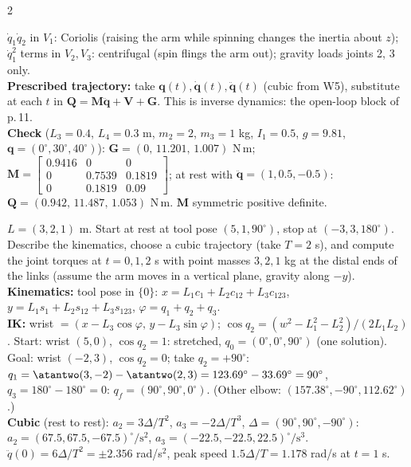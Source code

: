 \begin{multicols}{2}
\begin{examq}
$\dot q_1\dot q_2$ in $V_1$: Coriolis (raising the arm while spinning changes the inertia about $z$); $\dot q_1^2$ terms in $V_2,V_3$: centrifugal (spin flings the arm out); gravity loads joints 2, 3 only.\\
\textbf{Prescribed trajectory:} take $\mathbf q(t),\dot{\mathbf q}(t),\ddot{\mathbf q}(t)$ (cubic from W5), substitute at each $t$ in $\mathbf Q=\mathbf M\ddot{\mathbf q}+\mathbf V+\mathbf G$. This is inverse dynamics: the open-loop block of p.\,11.\\
\textbf{Check} ($L_3=0.4$, $L_4=0.3$ m, $m_2=2$, $m_3=1$ kg, $I_1=0.5$, $g=9.81$, $\mathbf q=(0^\circ,30^\circ,40^\circ)$): $\mathbf G=(0,\,11.201,\,1.007)$ N\,m; $\mathbf M=\begin{bmatrix}0.9416&0&0\\0&0.7539&0.1819\\0&0.1819&0.09\end{bmatrix}$; at rest with $\ddot{\mathbf q}=(1,0.5,-0.5)$: $\mathbf Q=(0.942,\,11.487,\,1.053)$ N\,m. $\mathbf M$ symmetric positive definite. \chk
\end{examq}
\begin{examq}
$L=(3,2,1)$ m. Start at rest at tool pose $(5,1,90^\circ)$, stop at $(-3,3,180^\circ)$. Describe the kinematics, choose a cubic trajectory (take $T=2$ s), and compute the joint torques at $t=0,1,2$ s with point masses $3,2,1$ kg at the distal ends of the links (assume the arm moves in a vertical plane, gravity along $-y$).
\solution
\textbf{Kinematics:} tool pose in $\{0\}$: $x=L_1c_1+L_2c_{12}+L_3c_{123}$, $y=L_1s_1+L_2s_{12}+L_3s_{123}$, $\varphi=q_1+q_2+q_3$.\\
\textbf{IK:} wrist $=(x-L_3\cos\varphi,\,y-L_3\sin\varphi)$; $\cos q_2=(w^2-L_1^2-L_2^2)/(2L_1L_2)$. Start: wrist $(5,0)$, $\cos q_2=1$: stretched, $q_0=(0^\circ,0^\circ,90^\circ)$ (one solution). Goal: wrist $(-2,3)$, $\cos q_2=0$; take $q_2=+90^\circ$: $q_1=\atantwo(3,-2)-\atantwo(2,3)=123.69^\circ-33.69^\circ=90^\circ$, $q_3=180^\circ-180^\circ=0$: $q_f=(90^\circ,90^\circ,0^\circ)$. (Other elbow: $(157.38^\circ,-90^\circ,112.62^\circ)$.)\\
\textbf{Cubic} (rest to rest): $a_2=3\Delta/T^2$, $a_3=-2\Delta/T^3$, $\Delta=(90^\circ,90^\circ,-90^\circ)$: $a_2=(67.5,67.5,-67.5)^\circ/\text{s}^2$, $a_3=(-22.5,-22.5,22.5)^\circ/\text{s}^3$. $\ddot q(0)=6\Delta/T^2=\pm2.356$ rad/s$^2$, peak speed $1.5\Delta/T=1.178$ rad/s at $t=1$ s.
\end{examq}

\end{multicols}
